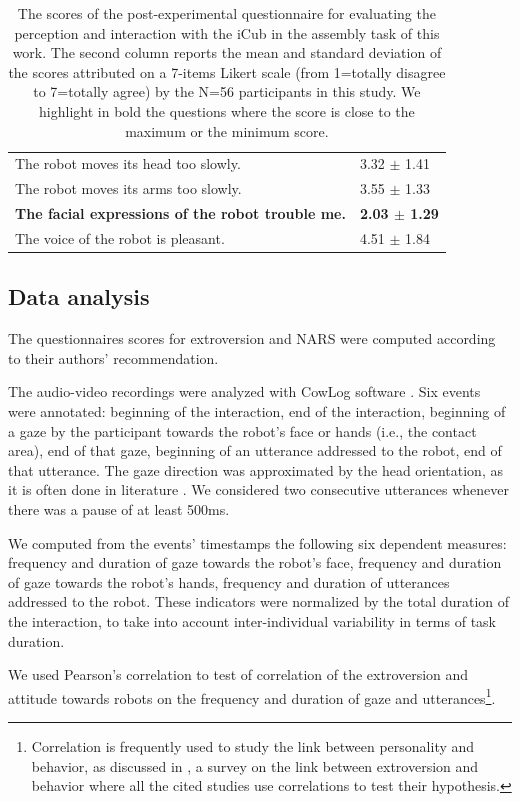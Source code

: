 \begin{table}
{\begin{tabular}{|p{12cm}|p{3.5cm}|}
 The robot moves its head too slowly. & 3.32 $\pm$ 1.41\\
 The robot moves its arms too slowly. & 3.55 $\pm$ 1.33\\
\textbf{The facial expressions of the robot trouble me.}& \textbf{2.03 $\pm$ 1.29}\\
 The voice of the robot is pleasant.& 4.51 $\pm$ 1.84\\
\hline
\end{tabular}}
\caption{The scores of the post-experimental questionnaire for evaluating the perception and interaction with the iCub in the assembly task of this work. The second column reports the mean and standard deviation of the scores attributed on a 7-items Likert scale (from 1=totally disagree to 7=totally agree) by the N=56 participants in this study. We highlight in bold the questions where the score is close to the maximum or the minimum score.}
\label{table:postexperimentquestionnairescores}
\end{table}


\subsection{Data analysis}

The questionnaires scores for extroversion and NARS were computed according to their authors' recommendation. 

The audio-video recordings were analyzed with CowLog software \cite{CowLog2009}. 
 Six events were annotated: beginning of the interaction, end of the interaction, beginning of a gaze by the participant towards the robot's face or hands (i.e., the contact area), end of that gaze, beginning of an utterance addressed to the robot, end of that utterance. 
The gaze direction was approximated by the head orientation, as it is often done in literature \cite{ivaldi2014frontiers,Ba2009}. 
We considered two consecutive utterances whenever there was a pause of at least 500ms. 

We computed from the events' timestamps the following six dependent measures: frequency and duration of gaze towards the robot's face, frequency and duration of gaze towards the robot's hands, frequency and duration of utterances addressed to the robot. 
These indicators were normalized by the total duration of the interaction, to take into account inter-individual variability in terms of task duration.

We used Pearson's correlation to test of correlation of the extroversion and attitude towards robots on the frequency and duration of gaze and utterances\footnote{Correlation is frequently used to study the link between personality and behavior, as discussed in \cite{LaFrance2004}, a survey on the link between extroversion and behavior where all the cited studies use correlations to test their hypothesis.}.




